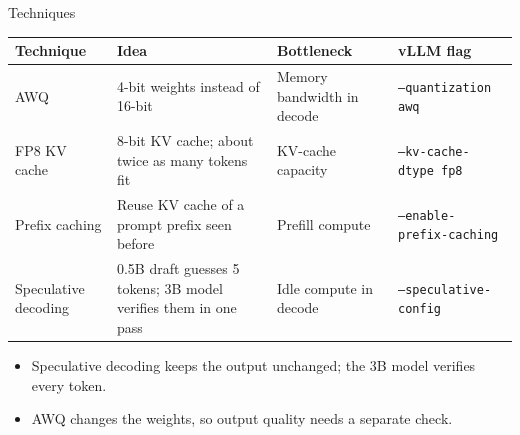 \documentclass[aspectratio=169,10pt,t]{beamer}
\newenvironment{points}{\raggedright\begin{itemize}\setlength{\itemsep}{.46em}}{\end{itemize}}
\begin{document}
\begin{frame}{Techniques}
\begin{tabularx}{\linewidth}{@{}P{2.6cm}XP{3.2cm}P{3.2cm}@{}}
\toprule
Technique & Idea & Bottleneck & vLLM flag\\
\midrule
AWQ & 4-bit weights instead of 16-bit & Memory bandwidth in decode & \texttt{--quantization awq}\\[.06cm]
FP8 KV cache & 8-bit KV cache; about twice as many tokens fit & KV-cache capacity & \texttt{--kv-cache-dtype fp8}\\[.06cm]
Prefix caching & Reuse KV cache of a prompt prefix seen before & Prefill compute & \texttt{--enable-prefix-caching}\\[.06cm]
Speculative decoding & 0.5B draft guesses 5 tokens; 3B model verifies them in one pass & Idle compute in decode & \texttt{--speculative-config}\\
\bottomrule
\end{tabularx}\par
\vspace{.2cm}
\begin{points}
\item Speculative decoding keeps the output unchanged; the 3B model verifies every token.
\item AWQ changes the weights, so output quality needs a separate check.
\end{points}
\end{frame}
\end{document}
